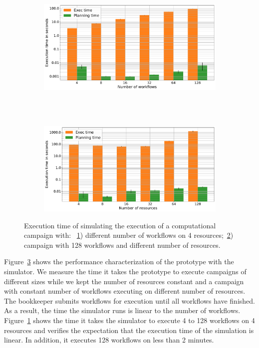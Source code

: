 \begin{figure}[t]
    \centering
    \begin{subfigure}[b]{0.75\textwidth}
        \includegraphics[width=.95\textwidth]{figures/manager/SimTimeWork.pdf}
        \caption{}
        \label{fig:SimTimeWork}
    \end{subfigure}\\
    ~ 
    \begin{subfigure}[b]{0.75\textwidth}
        \includegraphics[width=.95\textwidth]{figures/manager/SimTimeRes.pdf}
        \caption{}
        \label{fig:SimTimeRes}
    \end{subfigure}
    \caption{Execution time of simulating the execution of a computational campaign with: ~\ref{fig:SimTimeWork}) different number of workflows on 4 resources;~\ref{fig:SimTimeRes}) campaign with 128 workflows and different number of resources.}
    \label{fig:cm_char}
\end{figure}

Figure~\ref{fig:cm_char} shows the performance characterization of the prototype with the simulator.
We measure the time it takes the prototype to execute campaigns of different sizes while we kept the number of resources constant and a campaign with constant number of workflows executing on different number of resources.
The bookkeeper submits workflows for execution until all workflows have finished.
As a result, the time the simulator runs is linear to the number of workflows.
Figure~\ref{fig:SimTimeWork} shows the time it takes the simulator to execute 4 to 128 workflows on 4 resources and verifies the expectation that the execution time of the simulation is linear.
In addition, it executes 128 workflows on less than 2 minutes.

